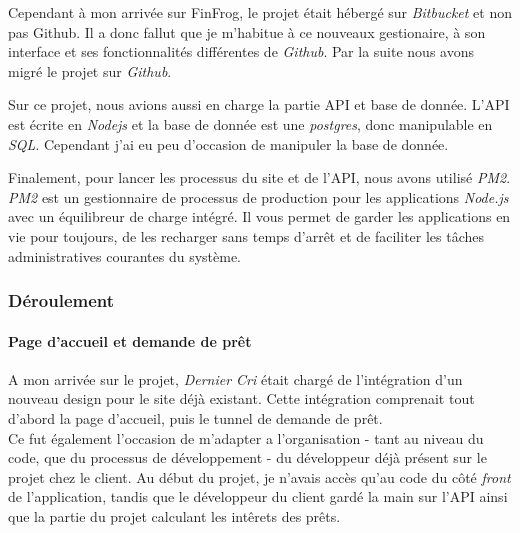 \documentclass[12pt,a4paper]{article}
\begin{document}
  \bigskip

  Cependant à mon arrivée sur FinFrog, le projet était hébergé sur
  \emph{Bitbucket} et non pas Github. Il a donc fallut que je m'habitue à
  ce nouveaux gestionaire, à son interface et ses fonctionnalités
  différentes de \emph{Github}. Par la suite nous avons migré le projet
  sur \emph{Github}.

  \bigskip

  Sur ce projet, nous avions aussi en charge la partie API et base de
  donnée. L'API est écrite en \emph{Nodejs} et la base de donnée est une
  \emph{postgres}, donc manipulable en \emph{SQL}. Cependant j'ai eu peu
  d'occasion de manipuler la base de donnée.

  \bigskip

  Finalement, pour lancer les processus du site et de l'API, nous avons
  utilisé \emph{PM2}. \emph{PM2} est un gestionnaire de processus de
  production pour les applications \emph{Node.js} avec un équilibreur de
  charge intégré. Il vous permet de garder les applications en vie pour
  toujours, de les recharger sans temps d'arrêt et de faciliter les tâches
  administratives courantes du système.

  \bigskip

  \subsubsection{Déroulement}\label{duxe9roulement-1}

  \paragraph{Page d'accueil et demande de
  prêt}\label{page-daccueil-et-demande-de-pruxeat}

  \bigskip

  A mon arrivée sur le projet, \emph{Dernier Cri} était chargé de
  l'intégration d'un nouveau design pour le site déjà existant. Cette
  intégration comprenait tout d'abord la page d'accueil, puis le tunnel de
  demande de prêt.\\
  Ce fut également l'occasion de m'adapter a l'organisation - tant au
  niveau du code, que du processus de développement - du développeur déjà
  présent sur le projet chez le client. Au début du projet, je n'avais
  accès qu'au code du côté \emph{front} de l'application, tandis que le
  développeur du client gardé la main sur l'API ainsi que la partie du
  projet calculant les intêrets des prêts.
\end{document}
